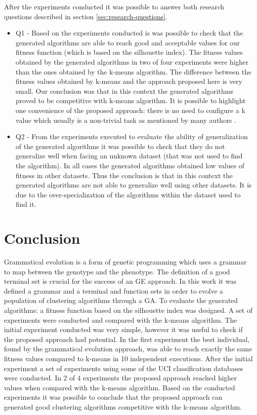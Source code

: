 \documentclass[journal]{IEEEtran}
\begin{document}
After the experiments conducted it was possible to answer both research questions described in section \ref{sec:research-questions}.
\begin{itemize}
	\item Q1 - Based on the experiments conducted is was possible to check that the generated algorithms are able to reach good and acceptable values for our fitness function (which is based on the silhouette index). The fitness values obtained by the generated algorithms in two of four experiments were higher than the ones obtained by the k-means algorithm. The difference between the fitness values obtained by k-means and the approach proposed here is very small. Our conclusion was that in this context the generated algorithms proved to be competitive with k-means algorithm. It is possible to highlight one convenience of the proposed approach: there is no need to configure a k value which usually is a non-trivial task as mentioned by many authors \cite{pham2005selection, yan2005methods, tibshirani2001estimating}.
	\item Q2 - From the experiments executed to evaluate the ability of generalization of the generated algorithms it was possible to check that they do not generalize well when facing an unknown dataset (that was not used to find the algorithm). In all cases the generated algorithms obtained low values of fitness in other datasets. Thus the conclusion is that in this context the generated algorithms are not able to generalize well using other datasets. It is due to the over-specialization of the algorithms within the dataset used to find it.
\end{itemize}


\section{Conclusion}
\label{sec:conclusion}

Grammatical evolution is a form of genetic programming which uses a grammar to map between the genotype and the phenotype. The definition of a good terminal set is crucial for the success of an GE approach. In this work it was defined a grammar and a terminal and function sets in order to evolve a population of clustering algorithms through a GA. To evaluate the generated algorithms: a fitness function based on the silhouette index was designed. A set of experiments were conducted and compared with the k-means algorithm. The initial experiment conducted was very simple, however it was useful to check if the proposed approach had potential. In the first experiment the best individual, found by the grammatical evolution approach, was able to reach exactly the same fitness values compared to k-means in 10 independent executions. After the initial experiment a set of experiments using some of the UCI classification databases were conducted. In 2 of 4 experiments the proposed approach reached higher values when compared with the k-means algorithm. Based on the conducted experiments it was possible to conclude that the proposed approach can generated good clustering algorithms competitive with the k-means algorithm.
\end{document}
